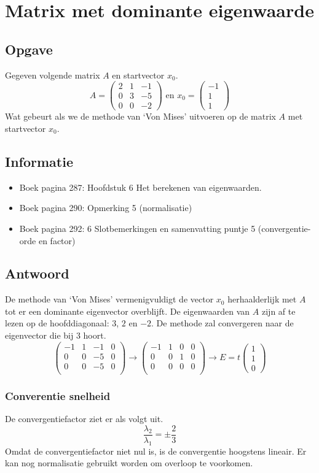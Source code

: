 \documentclass[examenvragen.tex]{subfiles}
\begin{document}
\section{Matrix met dominante eigenwaarde}
\subsection{Opgave}
Gegeven volgende matrix $A$ en startvector $x_0$.
\[
A =
\begin{pmatrix}
2 & 1 & -1\\
0 & 3 & -5\\
0 & 0 & -2
\end{pmatrix}
\text{ en }
x_0 = 
\begin{pmatrix}
-1\\1\\1
\end{pmatrix}
\]
Wat gebeurt als we de methode van `Von Mises' uitvoeren op de matrix $A$ met startvector $x_0$.

\subsection{Informatie}
\begin{itemize}
\item Boek pagina 287: Hoofdstuk 6 Het berekenen van eigenwaarden.
\item Boek pagina 290: Opmerking 5 (normalisatie)
\item Boek pagina 292: 6 Slotbemerkingen en samenvatting puntje 5 (convergentie- orde en factor)
\end{itemize}

\subsection{Antwoord}
De methode van `Von Mises' vermenigvuldigt de vector $x_0$ herhaalderlijk met $A$ tot er een dominante eigenvector overblijft.
De eigenwaarden van $A$ zijn af te lezen op de hoofddiagonaal: $3$, $2$ en $-2$. De methode zal convergeren naar de eigenvector die bij $3$ hoort.
\[
\left(
\begin{array}{ccc|c}
-1 & 1 & -1 & 0\\
0 & 0 & -5 & 0\\
0 & 0 & -5 & 0\\
\end{array}
\right)
\longrightarrow
\left(
\begin{array}{ccc|c}
-1 & 1 & 0 & 0\\
0 & 0 & 1 & 0\\
0 & 0 & 0 & 0\\
\end{array}
\right)
\longrightarrow
E = 
t
\begin{pmatrix}
1\\1\\0
\end{pmatrix}
\]
\subsubsection{Converentie snelheid}
De convergentiefactor ziet er als volgt uit.
\[
\frac{\lambda_2}{\lambda_1} = \pm \frac{2}{3}
\]
Omdat de convergentiefactor niet nul is, is de convergentie hoogstens lineair.
Er kan nog normalisatie gebruikt worden om overloop te voorkomen.
\end{document}
